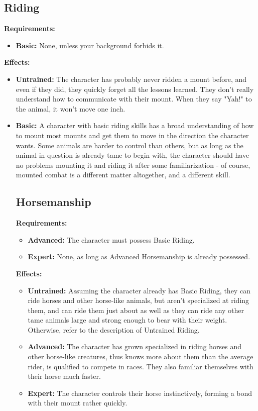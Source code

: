 \documentclass[openany,10pt,a4paper]{book}
\begin{document}
\subsection{Riding}
\textbf{Requirements:}
\begin{itemize}
	\item \textbf{Basic:} None, unless your background forbids it.
\end{itemize}
\textbf{Effects:}
\begin{itemize}
	\item \textbf{Untrained:} The character has probably never ridden a mount before, and even if they did, they quickly forget all the lessons learned. They don't really understand how to communicate with their mount. When they say "Yah!" to the animal, it won't move one inch. 
	\item \textbf{Basic:} A character with basic riding skills has a broad understanding of how to mount most mounts and get them to move in the direction the character wants. Some animals are harder to control than others, but as long as the animal in question is already tame to begin with, the character should have no problems mounting it and riding it after some familiarization - of course, mounted combat is a different matter altogether, and a different skill.
\subsection{Horsemanship}
\textbf{Requirements:}
\begin{itemize}
	\item \textbf{Advanced:} The character must possess Basic Riding.
	\item \textbf{Expert:} None, as long as Advanced Horsemanship is already possessed.
\end{itemize}
\textbf{Effects:}
\begin{itemize}
	\item \textbf{Untrained:} Assuming the character already has Basic Riding, they can ride horses and other horse-like animals, but aren't specialized at riding them, and can ride them just about as well as they can ride any other tame animals large and strong enough to bear with their weight. Otherwise, refer to the description of Untrained Riding.
	\item \textbf{Advanced:} The character has grown specialized in riding horses and other horse-like creatures, thus knows more about them than the average rider, is qualified to compete in races. They also familiar themselves with their horse much faster.
	\item \textbf{Expert:} The character controls their horse instinctively, forming a bond with their mount rather quickly.

\end{itemize}
\end{itemize}
\end{document}
